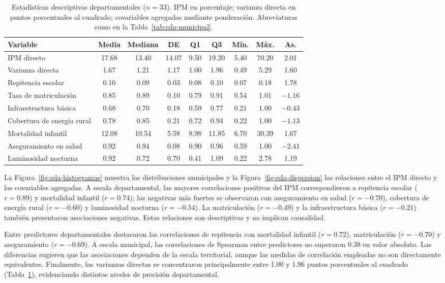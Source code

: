 \begin{table}[!htbp]
\centering
\scriptsize
\caption{Estadísticas descriptivas departamentales ($n=33$).
IPM en porcentaje; varianza directa en puntos porcentuales
al cuadrado; covariables agregadas mediante ponderación.
Abreviaturas como en la Tabla~\ref{tab:eda-municipal}.}
\label{tab:eda-departamental}
\renewcommand{\arraystretch}{1.1}
\setlength{\tabcolsep}{3pt}
\begin{tabular}{l c c c c c c c c}
\hline
Variable & Media & Mediana & DE & Q1 & Q3 & Mín. & Máx. & As. \\
\hline
IPM directo & 17.68 & 13.40 & 14.07 & 9.50 & 19.20 & 5.40 & 70.20 & 2.01 \\
Varianza directa & 1.67 & 1.21 & 1.17 & 1.00 & 1.96 & 0.49 & 5.29 & 1.60 \\
Repitencia escolar & 0.10 & 0.09 & 0.03 & 0.08 & 0.10 & 0.07 & 0.18 & 1.78 \\
Tasa de matriculación & 0.85 & 0.89 & 0.10 & 0.79 & 0.91 & 0.54 & 1.01 & $-1.16$ \\
Infraestructura básica & 0.68 & 0.70 & 0.18 & 0.59 & 0.77 & 0.21 & 1.00 & $-0.43$ \\
Cobertura de energía rural & 0.78 & 0.85 & 0.21 & 0.72 & 0.94 & 0.22 & 1.00 & $-1.13$ \\
Mortalidad infantil & 12.08 & 10.54 & 5.58 & 8.98 & 11.85 & 6.70 & 30.39 & 1.67 \\
Aseguramiento en salud & 0.92 & 0.94 & 0.08 & 0.90 & 0.96 & 0.59 & 1.00 & $-2.41$ \\
Luminosidad nocturna & 0.92 & 0.72 & 0.70 & 0.41 & 1.09 & 0.22 & 2.78 & 1.19 \\
\hline
\end{tabular}
\end{table}

La Figura~\ref{fig:eda-histogramas} muestra las distribuciones
municipales y la Figura~\ref{fig:eda-dispersion} las relaciones
entre el IPM directo y las covariables agregadas. A escala
departamental, las mayores correlaciones positivas del IPM
correspondieron a repitencia escolar ($r=0.89$) y mortalidad
infantil ($r=0.74$); las negativas más fuertes se observaron
con aseguramiento en salud ($r=-0.70$), cobertura de energía
rural ($r=-0.60$) y luminosidad nocturna ($r=-0.54$).
La matriculación ($r=-0.49$) y la infraestructura básica
($r=-0.21$) también presentaron asociaciones negativas.
Estas relaciones son descriptivas y no implican causalidad.

Entre predictores departamentales destacaron las correlaciones
de repitencia con mortalidad infantil ($r=0.72$), matriculación
($r=-0.70$) y aseguramiento ($r=-0.69$). A escala municipal,
las correlaciones de Spearman entre predictores no superaron
0.38 en valor absoluto. Las diferencias sugieren que las
asociaciones dependen de la escala territorial, aunque las
medidas de correlación empleadas no son directamente
equivalentes. Finalmente, las varianzas directas se concentraron
principalmente entre 1.00 y 1.96 puntos porcentuales al
cuadrado (Tabla~\ref{tab:eda-departamental}), evidenciando
distintos niveles de precisión departamental.

